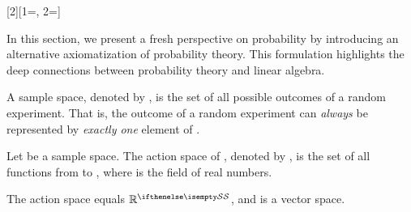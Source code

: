 
\newcommand{\sampleSetAlt}[1][s']{\set{#1}}
\newcommand{\actionSet}[1][\sampleSet]{\mathFix{\mathcal{A}_{#1}}}
\newcommand{\rstActionSet}[1][]{\actionSet[{\sampleSet \cap \event[{#1}]}]}
\newcommand{\actionSetAlt}{\actionSet[s']}
\newcommand{\rstOp}[1][\event]{\mathFix{R_{\cap #1}}}
\newcommand{\act}[1][\sampleSet]{\mathFix{\ell_{#1}}}
\newcommand{\rstAct}[1][\event]{\act[{\cap #1}]}
\newcommand{\F}[1][]{\mathFix{\functional[F]{#1}}}
\newcommand{\G}[1][]{\mathFix{\functional[G]{#1}}}
[2][1=, 2=\sampleSet]{}
\newcommand{\ExpAlt}[1][]{\Expect[{#1}][\sampleSetAlt]}
\newcommand{\ExpectOnE}[1][]{\mathFix{\Ex{\sampleSet \mid \event}{#1}}}
\newcommand{\event}[1][]{\mathFix{\set{e}_{#1}}}
\newcommand{\eventAlt}{\set{e}'}
\newcommand{\eventInS}{\mathFix{\event \subseteq \sampleSet}}
\newcommand{\inA}[1]{\mathFix{#1 \in \actionSet}}

\newcommand{\actAlt}[1][\cap \event']{\mathFix{\ell'_{#1}}}
\newcommand{\sure}[1][\sampleSet]{\mathFix{c_{#1}}}
\newcommand{\sureAlt}{\sure[\sampleSetAlt]}

\newcommand{\mapsDual}[2]{\maps[{\dualMap}]{\field{R}^{#1}}{\field{R}^{#2}}}
\newcommand{\dualdualMap}[1][M]{\mathFix{{#1}^{**}}}
\newcommand{\dualMap}[1][M]{\mathFix{{#1}^*}}

In this section, we present a fresh perspective on probability by introducing an alternative axiomatization of probability theory.
This formulation highlights the deep connections between probability theory and linear algebra.

\begin{definition} 
    A sample space, denoted by \sampleSet, is the set of all possible outcomes of a random experiment.
    That is, the outcome of a random experiment can \emph{always} be represented by \emph{exactly one} element of \sampleSet.
\end{definition}

\begin{definition} 
    Let \sampleSet be a sample space.
    The action space of \sampleSet, denoted by \actionSet, is the set of all functions from \sampleSet to , where 
    is the field of real numbers.
\end{definition}

\begin{proposition}
    The action space equals $\field{R}^{\sampleSet}$, and is a vector space.
\end{proposition}

